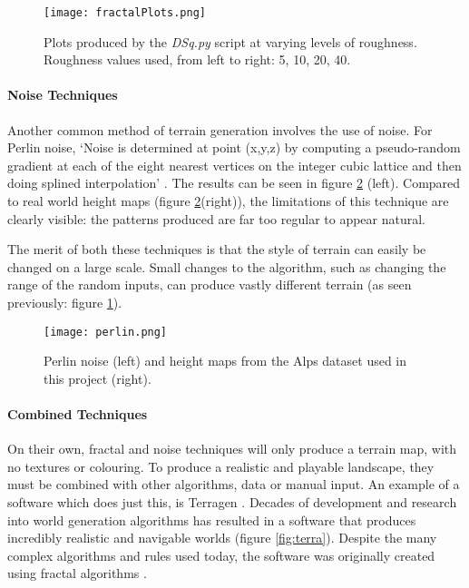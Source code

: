 \documentclass[a4paper]{report}
\begin{document}
\begin{figure}[H]
    \centering
        \texttt{[image: fractalPlots.png]}
        \caption{Plots produced by the \textit{DSq.py} script at varying levels of roughness. Roughness values used, from left to right: 5, 10, 20, 40.}
        \label{fig:fractalPlots}
\end{figure}

\paragraph{Noise Techniques}

Another common method of terrain generation involves the use of noise. For Perlin noise, `Noise is determined at point (x,y,z) by computing a pseudo-random gradient at each of the eight nearest vertices on the integer cubic lattice and then doing splined interpolation' \cite{perlinN}. The results can be seen in figure \ref{fig:perlin} (left). Compared to real world height maps (figure \ref{fig:perlin}(right)), the limitations of this technique are clearly visible: the patterns produced are far too regular to appear natural.

The merit of both these techniques is that the style of terrain can easily be changed on a large scale. Small changes to the algorithm, such as changing the range of the random inputs, can produce vastly different terrain (as seen previously: figure \ref{fig:fractalPlots}).

\begin{figure}[H]
    \centering
        \texttt{[image: perlin.png]}
        \caption{Perlin noise (left) and height maps from the Alps dataset used in this project (right).}
        \label{fig:perlin}
\end{figure}

\paragraph{Combined Techniques}
On their own, fractal and noise techniques will only produce a terrain map, with no textures or colouring. To produce a realistic and playable landscape, they must be combined with other algorithms, data or manual input. An example of a software which does just this, is Terragen \cite{terragen}. Decades of development and research into world generation algorithms has resulted in a software that produces incredibly realistic and navigable worlds (figure \ref{fig:terra}). Despite the many complex algorithms and rules used today, the software was originally created using fractal algorithms \cite{Fairc}.
\end{document}
